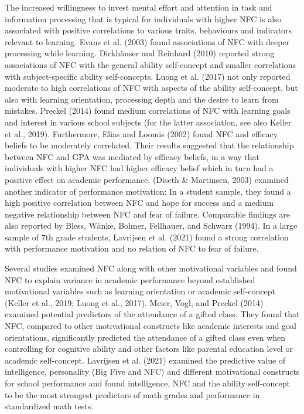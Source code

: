 \documentclass[
  man]{apa6}
\begin{document}
The increased willingness to invest mental effort and attention in task and information processing that is typical for individuals with higher NFC is also associated with positive correlations to various traits, behaviours and indicators relevant to learning. Evans et al. (2003) found associations of NFC with deeper processing while learning. Dickhäuser and Reinhard (2010) reported strong associations of NFC with the general ability self-concept and smaller correlations with subject-specific ability self-concepts. Luong et al. (2017) not only reported moderate to high correlations of NFC with aspects of the ability self-concept, but also with learning orientation, processing depth and the desire to learn from mistakes. Preckel (2014) found medium correlations of NFC with learning goals and interest in various school subjects (for the latter association, see also Keller et al., 2019). Furthermore, Elias and Loomis (2002) found NFC and efficacy beliefs to be moderately correlated. Their results suggested that the relationship between NFC and GPA was mediated by efficacy beliefs, in a way that individuals with higher NFC had higher efficacy belief which in turn had a positive effect on academic performance. (Diseth \& Martinsen, 2003) examined another indicator of performance motivation: In a student sample, they found a high positive correlation between NFC and hope for success and a medium negative relationship between NFC and fear of failure. Comparable findings are also reported by Bless, Wänke, Bohner, Fellhauer, and Schwarz (1994). In a large sample of 7th grade students, Lavrijsen et al. (2021) found a strong correlation with performance motivation and no relation of NFC to fear of failure.

Several studies examined NFC along with other motivational variables and found NFC to explain variance in academic performance beyond established motivational variables such as learning orientation or academic self-concept (Keller et al., 2019; Luong et al., 2017). Meier, Vogl, and Preckel (2014) examined potential predictors of the attendance of a gifted class. They found that NFC, compared to other motivational constructs like academic interests and goal orientations, significantly predicted the attendance of a gifted class even when controlling for cognitive ability and other factors like parental education level or academic self-concept. Lavrijsen et al. (2021) examined the predictive value of intelligence, personality (Big Five and NFC) and different motivational constructs for school performance and found intelligence, NFC and the ability self-concept to be the most strongest predictors of math grades and performance in standardized math tests.
\end{document}

